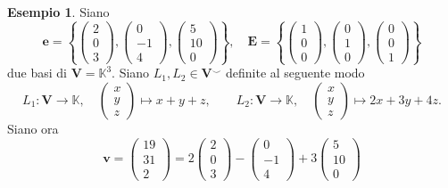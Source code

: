 \documentclass{article}
\theoremstyle{plain}
\theoremstyle{definition}
\newtheorem{exmp}{Esempio}[section]
\theoremstyle{remark}
\begin{document}
\begin{exmp}
    Siano 
    \[\mathbf{e}=\left\{\begin{pmatrix}2\\0\\3\end{pmatrix},\begin{pmatrix}0\\-1\\4\end{pmatrix},\begin{pmatrix}5\\10\\0\end{pmatrix}\right\},\quad \mathbf{E}=\left\{\begin{pmatrix}1\\0\\0\end{pmatrix},\begin{pmatrix}0\\1\\0\end{pmatrix},\begin{pmatrix}0\\0\\1\end{pmatrix}\right\}\] 
    due basi di $\mathbf{V}=\mathbb{K}^3$.
    Siano $L_1,L_2\in\mathbf{V}^\smallsmile$ definite al seguente modo 
    \[L_1:\mathbf{V}\to\mathbb{K},\quad \begin{pmatrix}
        x\\y\\z
    \end{pmatrix}\mapsto x+y+z, \quad\quad L_2:\mathbf{V}\to\mathbb{K},\quad \begin{pmatrix}
        x\\y\\z
    \end{pmatrix}\mapsto 2x+3y+4z.\]
    Siano ora 
    \[
        \mathbf{v}=\begin{pmatrix}19\\31\\2\end{pmatrix}=2\begin{pmatrix}2\\0\\3\end{pmatrix}-\begin{pmatrix}0\\-1\\4\end{pmatrix}+3\begin{pmatrix}5\\10\\0\end{pmatrix}
\]
\end{exmp}
\end{document}
